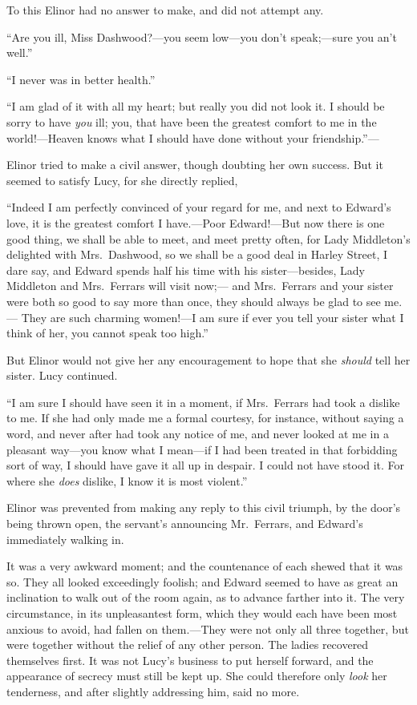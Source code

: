 \documentclass{article}
\begin{document}
To this Elinor had no answer to make, and did not
attempt any.

``Are you ill, Miss Dashwood?---you seem low---you
don't speak;---sure you an't well.''

``I never was in better health.''

``I am glad of it with all my heart; but really you did
not look it.  I should be sorry to have \emph{you} ill; you, that have
been the greatest comfort to me in the world!---Heaven
knows what I should have done without your friendship.''---%

Elinor tried to make a civil answer, though doubting
her own success.  But it seemed to satisfy Lucy, for she
directly replied,

``Indeed I am perfectly convinced of your regard
for me, and next to Edward's love, it is the greatest
comfort I have.---Poor Edward!---But now there is one
good thing, we shall be able to meet, and meet pretty often,
for Lady Middleton's delighted with Mrs.\ Dashwood,
so we shall be a good deal in Harley Street, I dare say,
and Edward spends half his time with his sister---besides,
Lady Middleton and Mrs.\ Ferrars will visit now;---%
and Mrs.\ Ferrars and your sister were both so good to say
more than once, they should always be glad to see me.---%
They are such charming women!---I am sure if ever you
tell your sister what I think of her, you cannot speak
too high.''

But Elinor would not give her any encouragement
to hope that she \emph{should} tell her sister.  Lucy continued.

``I am sure I should have seen it in a moment,
if Mrs.\ Ferrars had took a dislike to me.  If she had only
made me a formal courtesy, for instance, without saying
a word, and never after had took any notice of me,
and never looked at me in a pleasant way---you know
what I mean---if I had been treated in that forbidding
sort of way, I should have gave it all up in despair.
I could not have stood it.  For where she \emph{does} dislike,
I know it is most violent.''

Elinor was prevented from making any reply to this
civil triumph, by the door's being thrown open, the servant's
announcing Mr.\ Ferrars, and Edward's immediately walking in.

It was a very awkward moment; and the countenance of each
shewed that it was so.  They all looked exceedingly foolish;
and Edward seemed to have as great an inclination to walk
out of the room again, as to advance farther into it.
The very circumstance, in its unpleasantest form,
which they would each have been most anxious to avoid,
had fallen on them.---They were not only all three together,
but were together without the relief of any other person.
The ladies recovered themselves first.  It was not Lucy's
business to put herself forward, and the appearance of
secrecy must still be kept up.  She could therefore only
\emph{look} her tenderness, and after slightly addressing him,
said no more.
\end{document}
